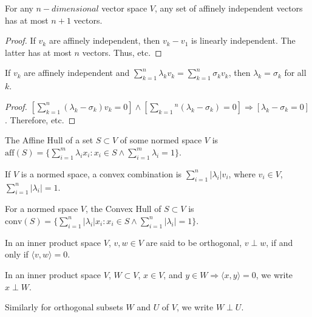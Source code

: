 \documentclass[crop=false,class=article,oneside]{standalone}
\begin{document}
        \begin{corollary}
        For any $n-dimensional$ vector space $V$, any set of affinely independent vectors has at most $n+1$ vectors.
        \end{corollary}
        \begin{proof}
        If $v_k$ are affinely independent, then $v_k-v_1$ is linearly independent. The latter has at most $n$ vectors. Thus, etc.
        \end{proof}
        \begin{corollary}
        If $v_k$ are affinely independent and $\sum_{k=1}^{n}\lambda_k v_k = \sum_{k=1}^{n} \sigma_k v_k$, then $\lambda_k = \sigma_k$ for all $k$.
        \end{corollary}
        \begin{proof}
        $[\sum_{k=1}^{n}(\lambda_k - \sigma_k)v_k = 0]\land[\sum_{k=1}{^n}(\lambda_k-\sigma_k) = 0]\Rightarrow [\lambda_k-\sigma_k = 0]$. Therefore, etc.
        \end{proof}
        \begin{definition}
        The Affine Hull of a set $S\subset V$ of some normed space $V$ is $\textrm{aff}(S) = \{\sum_{i=1}^{m}\lambda_i x_i: x_i \in S\land \sum_{i=1}^{m}\lambda_i =1\}$.
        \end{definition}
        \begin{definition}
        If $V$ is a normed space, a convex combination is $\sum_{i=1}^{n}|\lambda_i| v_i$, where $v_i\in V$, $\sum_{i=1}^{n}|\lambda_i| = 1$.
        \end{definition}
        \begin{definition}
        For a normed space $V$, the Convex Hull of $S\subset V$ is $\textrm{conv}(S)=\{\sum_{i=1}^{n}|\lambda_i| x_i:x_i\in S\land \sum_{i=1}^{n} |\lambda_i| = 1 \}$.
        \end{definition}
        \begin{definition}
        In an inner product space $V$, $v,w\in V$ are said to be orthogonal, $v\perp w$, if and only if $\langle v,w \rangle = 0$.
        \end{definition}
        \begin{notation}
        In an inner product space $V$, $W\subset V$, $x\in V$, and $y\in W \Rightarrow \langle x,y\rangle = 0$, we write $x\perp W$.
        \end{notation}
        \begin{notation}
        Similarly for orthogonal subsets $W$ and $U$ of $V$, we write $W\perp U$.
        \end{notation}
\end{document}
